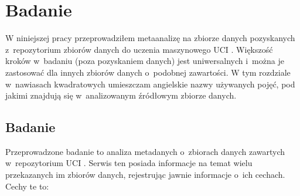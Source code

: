 \chapter{Badanie}

W niniejszej pracy przeprowadziłem metaanalizę na zbiorze danych pozyskanych z~repozytorium zbiorów danych do uczenia maszynowego UCI \cite{Dua:2021}.
Większość kroków w~badaniu (poza pozyskaniem danych) jest uniwersalnych i~można je zastosować dla innych zbiorów danych o~podobnej zawartości.
W tym rozdziale w~nawiasach kwadratowych umieszczam angielskie nazwy używanych pojęć, pod jakimi znajdują się w~analizowanym źródłowym zbiorze danych.

\section{Badanie}

Przeprowadzone badanie to analiza metadanych o~zbiorach danych zawartych w~repozytorium UCI \cite{Dua:2021}.
Serwis ten posiada informacje na temat wielu przekazanych im zbiorów danych, rejestrując jawnie informacje o~ich cechach.
Cechy te to:

